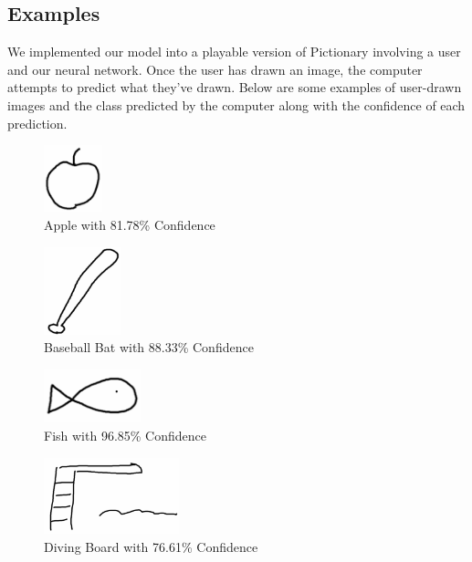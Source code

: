 \documentclass[10pt,twocolumn,letterpaper]{article}
\begin{document}
\subsection{Examples}

We implemented our model into a playable version of Pictionary involving a user and our neural network. Once the user has drawn an image, the computer attempts to predict what they’ve drawn. Below are some examples of user-drawn images and the class predicted by the computer along with the confidence of each prediction.

\begin{figure}[H]
  \centering
  \includegraphics[width=0.15\textwidth]{apple_drawing.png}
  \caption{Apple with 81.78\% Confidence}
\end{figure}

\begin{figure}[H]
  \centering
  \includegraphics[width=0.2\textwidth]{bat_drawing.png}
  \caption{Baseball Bat with 88.33\% Confidence}
\end{figure}

\begin{figure}[H]
  \centering
  \includegraphics[width=0.25\textwidth]{fish_drawing.png}
  \caption{Fish with 96.85\% Confidence}
\end{figure}

\begin{figure}[H]
  \centering
  \includegraphics[width=0.35\textwidth]{diving_drawing.png}
  \caption{Diving Board with 76.61\% Confidence}
\end{figure}
\end{document}
